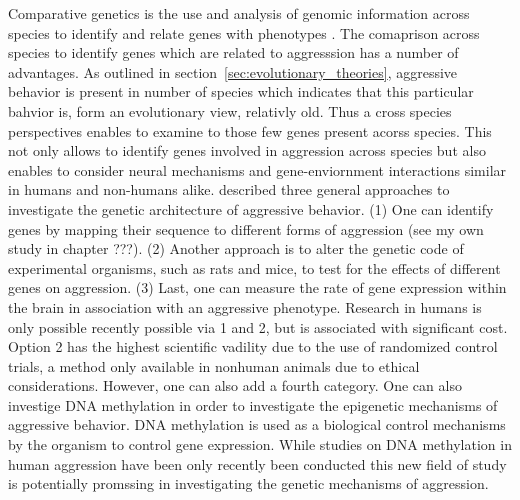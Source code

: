 Comparative genetics is the use and analysis of genomic information across species to identify and relate genes with phenotypes \cite{Maxson2003}.
The comaprison across species to identify genes which are related to aggresssion has a number of advantages.
As outlined in section~\ref{sec:evolutionary_theories}, aggressive behavior is present in number of species which indicates that this particular bahvior is, form an evolutionary view, relativly old.
Thus a cross species perspectives enables to examine to those few genes present acorss species.
This not only allows to identify genes involved in aggression across species but also enables to consider neural mechanisms and gene-enviornment interactions similar in humans and non-humans alike.
\citet{Maxson2005} described three general approaches to investigate the genetic architecture of aggressive behavior.
(1) One can identify genes by mapping their sequence to different forms of aggression (see my own study in chapter ???).
(2) Another approach is to alter the genetic code of experimental organisms, such as rats and mice, to test for the effects of different genes on aggression.
(3) Last, one can measure the rate of gene expression within the brain in association with an aggressive phenotype.
Research in humans is only possible recently possible via 1 and 2, but is associated with significant cost.
Option 2 has the highest scientific vadility due to the use of randomized control trials, a method only available in nonhuman animals due to ethical considerations.
However, one can also add a fourth category.
One can also investige DNA methylation in order to investigate the epigenetic mechanisms of aggressive behavior.
DNA methylation is used as a biological control mechanisms by the organism to control gene expression.
While studies on DNA methylation in human aggression have been only recently been conducted \cite{VanDongen2015a} this new field of study is potentially promssing in investigating the genetic mechanisms of aggression.


